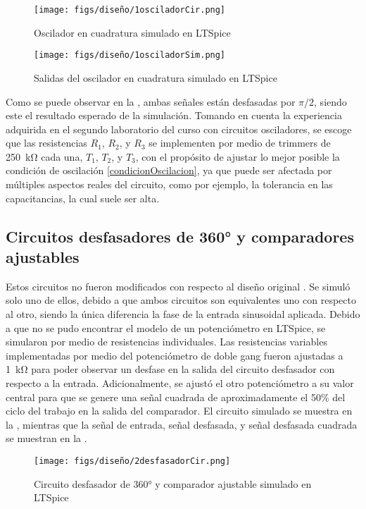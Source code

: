 \newpage
\begin{figure}[H]
    \centering
    \texttt{[image: figs/diseño/1osciladorCir.png]}
    \caption{Oscilador en cuadratura simulado en LTSpice}
    \label{cuadraturaCir}
\end{figure}

\begin{figure}[H]
    \centering
    \texttt{[image: figs/diseño/1osciladorSim.png]}
    \caption{Salidas del oscilador en cuadratura simulado en LTSpice}
    \label{cuadraturaSim}
\end{figure}

Como se puede observar en la , ambas señales están desfasadas por $\pi/2$, siendo este el resultado esperado de la simulación.
Tomando en cuenta la experiencia adquirida en el segundo laboratorio del curso con circuitos osciladores, se escoge que las resistencias $R_1$, $R_2$, y $R_3$ se implementen por medio de trimmers de \SI{250}{\kohm} cada una, $T_1$, $T_2$, y $T_3$, con el propósito de ajustar lo mejor posible la condición de oscilación \eqref{condicionOscilacion}, ya que puede ser afectada por múltiples aspectos reales del circuito, como por ejemplo, la tolerancia en las capacitancias, la cual suele ser alta. 

\subsection{Circuitos desfasadores de 360° y comparadores ajustables}
Estos circuitos no fueron modificados con respecto al diseño original \cite{pong}.
Se simuló solo uno de ellos, debido a que ambos circuitos son equivalentes uno con respecto al otro, siendo la única diferencia la fase de la entrada sinusoidal aplicada. 
Debido a que no se pudo encontrar el modelo de un potenciómetro en LTSpice, se simularon por medio de resistencias individuales.
Las resistencias variables implementadas por medio del potenciómetro de doble gang fueron ajustadas a \SI{1}{\kohm} para poder observar un desfase en la salida del circuito desfasador con respecto a la entrada.
Adicionalmente, se ajustó el otro potenciómetro a su valor central para que se genere una señal cuadrada de aproximadamente el 50\% del ciclo del trabajo en la salida del comparador.
El circuito simulado se muestra en la , mientras que la señal de entrada, señal desfasada, y señal desfasada cuadrada se muestran en la .

\begin{figure}[H]
    \centering
    \texttt{[image: figs/diseño/2desfasadorCir.png]}
    \caption{Circuito desfasador de 360° y comparador ajustable simulado en LTSpice}
    \label{desfasadorCir}
\end{figure}

